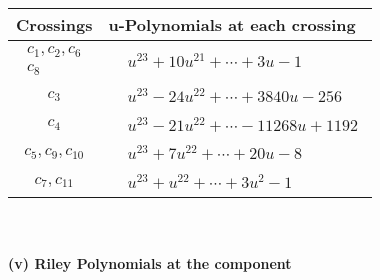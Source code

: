 \documentclass[1p]{elsarticle_modified}
\theoremstyle{definition}
\begin{document}
\begin{tabular}{m{50pt}|m{274pt}}
Crossings & \hspace{64pt}u-Polynomials at each crossing \\
\hline $$\begin{aligned}c_{1},c_{2},c_{6}\\c_{8}\end{aligned}$$&$\begin{aligned}
&u^{23}+10 u^{21}+\cdots+3 u-1
\end{aligned}$\\
\hline $$\begin{aligned}c_{3}\end{aligned}$$&$\begin{aligned}
&u^{23}-24 u^{22}+\cdots+3840 u-256
\end{aligned}$\\
\hline $$\begin{aligned}c_{4}\end{aligned}$$&$\begin{aligned}
&u^{23}-21 u^{22}+\cdots-11268 u+1192
\end{aligned}$\\
\hline $$\begin{aligned}c_{5},c_{9},c_{10}\end{aligned}$$&$\begin{aligned}
&u^{23}+7 u^{22}+\cdots+20 u-8
\end{aligned}$\\
\hline $$\begin{aligned}c_{7},c_{11}\end{aligned}$$&$\begin{aligned}
&u^{23}+u^{22}+\cdots+3 u^2-1
\end{aligned}$\\
\hline
\end{tabular}\\~\\
\newpage\renewcommand{\arraystretch}{1}
\flushleft \textbf{(v) Riley Polynomials at the component}\newline \\
\end{document}
